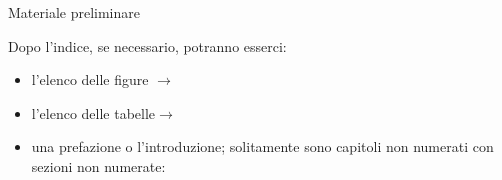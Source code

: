 \documentclass{beamer}
\begin{document}
\begin{frame}{Materiale preliminare}

Dopo l'indice, se necessario, potranno esserci:
\begin{itemize}
\item l'elenco delle figure $\rightarrow$ 
\item l'elenco delle tabelle$\rightarrow$ 
\item una prefazione o l'introduzione; solitamente sono capitoli non numerati con sezioni non numerate:
\begin{center}
\Large{} 
\end{center}
\end{itemize}
\end{frame}
\end{document}
